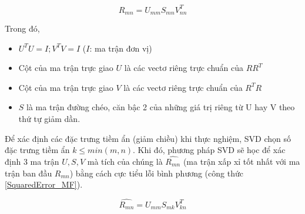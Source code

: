 \begin{equation}
R_{mn} = U_{mm}S_{mn}V_{nn}^T
\end{equation}

Trong đó,
\begin{itemize}
	\item $U^TU = I; V^TV = I$ ($I$: ma trận đơn vị)
	\item Cột của ma trận trực giao $U$ là các vectơ riêng trực chuẩn của $RR^T$
	\item Cột của ma trận trực giao $V$ là các vectơ riêng trực chuẩn của $R^TR$
	\item $S$ là ma trận đường chéo, căn bậc 2 của những giá trị riêng từ U hay V theo thứ tự giảm dần.
\end{itemize}

Để xác định các đặc trưng tiềm ẩn (giảm chiều) khi thực nghiệm, SVD chọn số đặc trưng tiềm ẩn $k \leq min(m, n)$. Khi đó, phương pháp SVD sẽ học để xác định 3 ma trận $U, S, V$ mà tích của chúng là $\hat{R_{mn}}$ (ma trận xấp xỉ tốt nhất với ma trận ban đầu $R_{mn}$) bằng cách cực tiểu lỗi bình phương (công thức \ref{SquaredError_MF}). 

\begin{equation}
\hat{R_{mn}} = U_{mm}S_{mk}V_{kn}^T
\end{equation}

